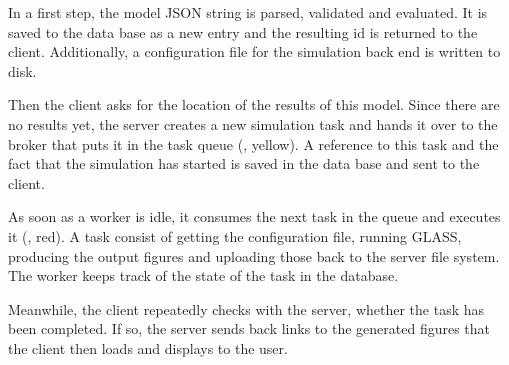 
In a first step, the model JSON string is parsed, validated and evaluated.
It is saved to the data base as a new entry and the resulting id is returned to the client.
Additionally, a configuration file for the simulation back end is written to disk. 

Then the client asks for the location of the results of this model.
Since there are no results yet, the server creates a new simulation task and hands it over to the broker that puts it in the task queue (, yellow).
A reference to this task and the fact that the simulation has started is saved in the data base and sent to the client.

As soon as a worker is idle, it consumes the next task in the queue and executes it (, red).
A task consist of getting the configuration file, running GLASS, producing the output figures and uploading those back to the server file system.
The worker keeps track of the state of the task in the database.

Meanwhile, the client repeatedly checks with the server, whether the task has been completed.
If so, the server sends back links to the generated figures that the client then loads and displays to the user.







